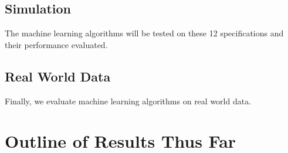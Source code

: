 \documentclass[man, a4paper, biblatex]{article}
\begin{document}
\subsection{Simulation}

The machine learning algorithms will be tested on these 12 specifications and their performance evaluated.

\subsection{Real World Data}

Finally, we evaluate machine learning algorithms on real world data. 

\section{Outline of Results Thus Far}
\end{document}
